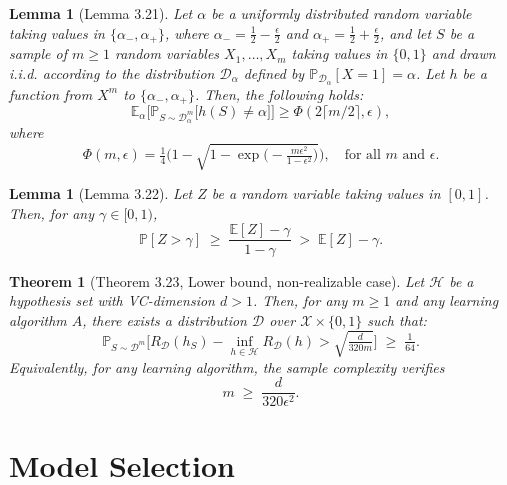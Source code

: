 \documentclass[12pt]{article}
\theoremstyle{definition} %
\theoremstyle{plain} %
\newtheorem{theorem}[definition]{Theorem}
\newtheorem{lemma}[definition]{Lemma}
\theoremstyle{remark} %
\begin{document}
\begin{CJK}{UTF8}{gbsn}
\begin{lemma}[Lemma 3.21]
Let $\alpha$ be a uniformly distributed random variable taking values in $\{\alpha_{-}, \alpha_{+}\}$, where 
$\alpha_{-} = \tfrac{1}{2} - \tfrac{\epsilon}{2}$ and $\alpha_{+} = \tfrac{1}{2} + \tfrac{\epsilon}{2}$, 
and let $S$ be a sample of $m \geq 1$ random variables $X_1, \ldots, X_m$ taking values in $\{0,1\}$ 
and drawn i.i.d. according to the distribution $\mathcal{D}_\alpha$ defined by 
$\mathbb{P}_{\mathcal{D}_\alpha}[X=1] = \alpha$. 
Let $h$ be a function from $X^m$ to $\{\alpha_{-}, \alpha_{+}\}$. Then, the following holds:
\[
\mathbb{E}_\alpha \Bigg[ \mathbb{P}_{S \sim \mathcal{D}_\alpha^m} \big[ h(S) \neq \alpha \big] \Bigg] 
\geq \Phi(2 \lceil m/2 \rceil, \epsilon),
\]
where
\[
\Phi(m, \epsilon) = \tfrac{1}{4}\Bigg( 1 - \sqrt{1 - \exp\Big(- \tfrac{m\epsilon^2}{1-\epsilon^2}\Big)} \Bigg), 
\quad \text{for all $m$ and $\epsilon$.}
\]
\end{lemma}

\begin{lemma}[Lemma 3.22]
Let $Z$ be a random variable taking values in $[0,1]$. Then, for any $\gamma \in [0,1)$,
\[
\mathbb{P}[Z > \gamma] \;\geq\; \frac{\mathbb{E}[Z] - \gamma}{1-\gamma} \;>\; \mathbb{E}[Z] - \gamma.
\]
\end{lemma}

\begin{theorem}[Theorem 3.23, Lower bound, non-realizable case]
Let $\mathcal{H}$ be a hypothesis set with VC-dimension $d > 1$. 
Then, for any $m \geq 1$ and any learning algorithm $A$, 
there exists a distribution $\mathcal{D}$ over $\mathcal{X} \times \{0,1\}$ such that:
\[
\mathbb{P}_{S \sim \mathcal{D}^m} \Bigg[ R_{\mathcal{D}}(h_S) - \inf_{h \in \mathcal{H}} R_{\mathcal{D}}(h) 
> \sqrt{\tfrac{d}{320m}} \Bigg] \;\geq\; \tfrac{1}{64}.
\]
Equivalently, for any learning algorithm, the sample complexity verifies
\[
m \;\geq\; \frac{d}{320\epsilon^2}.
\]
\end{theorem}

\section{Model Selection}

\end{CJK}
\end{document}
